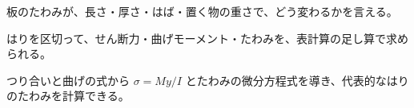 \begin{furikaeri}
\begin{checklist}
\item 板のたわみが、長さ・厚さ・はば・置く物の重さで、どう変わるかを言える。
\item はりを区切って、せん断力・曲げモーメント・たわみを、表計算の足し算で求められる。
\item つり合いと曲げの式から $\sigma=My/I$ とたわみの微分方程式を導き、代表的なはりのたわみを計算できる。
\end{checklist}
\end{furikaeri}
